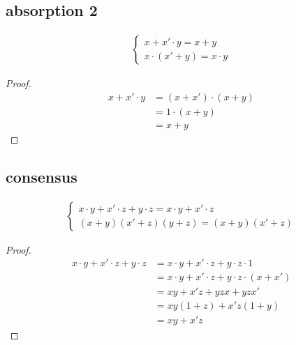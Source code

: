\documentclass[a4paper,12pt]{article}
\begin{document}
\subsection{absorption 2}
\label{sec:orgd64ef6a}
\begin{lemma}
\begin{gather*}
  \begin{cases}
    x + x' \cdot y = x + y\\
    x \cdot (x' + y) = x \cdot y
  \end{cases}
\end{gather*}
\begin{proof}
\begin{align*}
  x + x' \cdot y &= (x + x') \cdot (x + y)\\
                 &= 1 \cdot (x + y)\\
                 &= x + y
\end{align*}
\end{proof}
\end{lemma}
\subsection{consensus}
\label{sec:org283a0d1}
\begin{lemma}
\begin{gather*}
  \begin{cases}
    x \cdot y + x' \cdot z + y \cdot z = x \cdot y + x' \cdot z\\
    (x + y)(x' + z)(y + z) = (x + y)(x' + z)
  \end{cases}
\end{gather*}
\begin{proof}
\begin{align*}
  x \cdot y + x' \cdot z + y \cdot z &= x \cdot y + x' \cdot z + y \cdot z \cdot 1\\
                                     &= x \cdot y + x' \cdot z + y \cdot z \cdot (x + x')\\
                                     &= xy + x'z + yzx + yzx'\\
                                     &= xy(1 + z) + x'z(1 + y)\\
                                     &= xy + x'z
\end{align*}
\end{proof}
\end{lemma}
\end{document}
